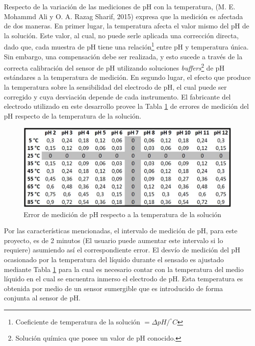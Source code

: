             \par Respecto de la variación de las mediciones de pH con la temperatura, (M. E. Mohammd Ali y O. A. Razag Sharif, 2015) expresa que la medición es afectada de dos maneras. En primer lugar, la temperatura afecta el valor mismo del pH de la solución. Este valor, al cual, no puede serle aplicada una corrección directa, dado que, cada muestra de pH tiene una relación\footnote{Coeficiente de temperatura de la solución  $ = \Delta pH/ ^{\circ}C $} entre pH y temperatura única. Sin embargo, una compensación debe ser realizada, y esto sucede a través de la correcta calibración del sensor de pH utilizando soluciones \textit{buffers}\footnote{Solución química que posee un valor de pH conocido.} de pH estándares a la temperatura de medición. En segundo lugar, el efecto que produce la temperatura sobre la sensibilidad del electrodo de pH, el cual puede ser corregido y cuya desviación depende de cada instrumento. El fabricante del electrodo utilizado en este desarrollo provee la Tabla \ref{tablePhvsTemp} de errores de medición del pH respecto de la temperatura de la solución. 

            \begin{figure}[h] 
                \centering
                \includegraphics[scale=0.6]{hardware/ErrorMedicionPH.jpg}
                \caption{Error de medición de pH respecto a la temperatura de la solución}
                \label{tablePhvsTemp}
            \end{figure}
            
            \par Por las características mencionadas, el intervalo de medición de pH, para este proyecto, es de 2 minutos (El usuario puede aumentar este intervalo si lo requiere) asumiendo así el correspondiente error. El desvío de medición del pH ocasionado por la temperatura del líquido durante el sensado es ajustado mediante Tabla \ref{tablePhvsTemp} para la cual es necesario contar con la temperatura del medio líquido en el cual se encuentra inmerso el electrodo de pH. Esta temperatura es obtenida por medio de un sensor sumergible que es introducido de forma conjunta al sensor de pH.
        
